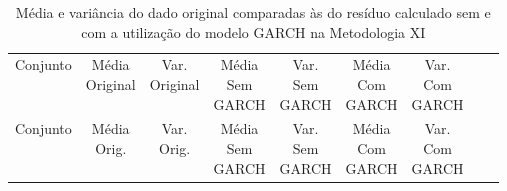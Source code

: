 \clearpage

\begin{center}
\begin{longtable}{ccccccccc}
\toprule
\rowcolor{white}
\caption[Metodologia XI: dados estatísticos]{Média e variância do dado original
comparadas às do resíduo calculado sem e com a utilização do modelo GARCH na
Metodologia XI} \label{tab:DadosEstatisticosMet11}\\
\midrule
    Conjunto & \specialcell{Média\\Original} &
    \specialcell{Var.\\Original} & \specialcell{Média\\Sem\\GARCH} &
    \specialcell{Var.\\Sem\\GARCH} & \specialcell{Média\\Com\\GARCH}&
    \specialcell{Var.\\Com\\GARCH} \\

\midrule
\endfirsthead 
\midrule
\rowcolor{white}
    Conjunto & \specialcell{Média\\Orig.} &
    \specialcell{Var.\\Orig.} & \specialcell{Média\\Sem\\GARCH} &
    \specialcell{Var.\\Sem\\GARCH} & \specialcell{Média\\Com\\GARCH}&
    \specialcell{Var.\\Com\\GARCH} \\


\end{longtable}
\end{center}
